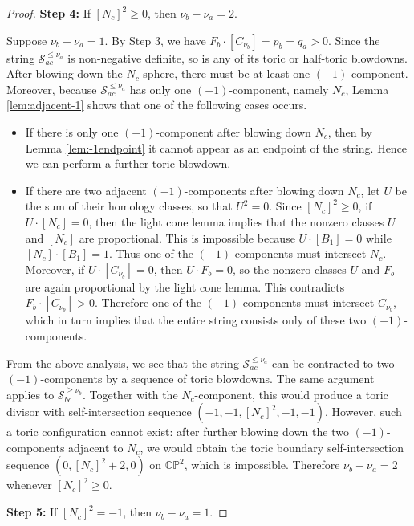 \documentclass[11pt]{article}
\theoremstyle{definition}
\theoremstyle{remark}
\newcommand{\CP}{\mathbb{CP}}
\newcommand{\st}{\mathcal{S}}
\begin{document}
\begin{proof}
\medskip
{\bf Step 4:} If $[N_c]^2\geq 0$, then $\nu_b-\nu_a=2$.

Suppose $\nu_b-\nu_a=1$. By Step 3, we have $F_b\cdot[C_{\nu_b}]=p_b=q_a>0$. Since the string $\st_{ac}^{\leq \nu_a}$ is non-negative definite, so is any of its toric or half-toric blowdowns. After blowing down the $N_c$-sphere, there must be at least one $(-1)$-component. Moreover, because $\st_{ac}^{\leq \nu_a}$ has only one $(-1)$-component, namely $N_c$, Lemma \ref{lem:adjacent-1} shows that one of the following cases occurs.
\begin{itemize}[nosep]
\item If there is only one $(-1)$-component after blowing down $N_c$, then by Lemma \ref{lem:-1endpoint} it cannot appear as an endpoint of the string. Hence we can perform a further toric blowdown.
\item If there are two adjacent $(-1)$-components after blowing down $N_c$, let $U$ be the sum of their homology classes, so that $U^2=0$. Since $[N_c]^2\geq 0$, if $U\cdot [N_c]=0$, then the light cone lemma implies that the nonzero classes $U$ and $[N_c]$ are proportional. This is impossible because $U\cdot [B_1]=0$ while $[N_c]\cdot [B_1]=1$. Thus one of the $(-1)$-components must intersect $N_c$. Moreover, if $U\cdot [C_{\nu_b}]=0$, then $U\cdot F_b=0$, so the nonzero classes $U$ and $F_b$ are again proportional by the light cone lemma. This contradicts $F_b\cdot [C_{\nu_b}]>0$. Therefore one of the $(-1)$-components must intersect $C_{\nu_b}$, which in turn implies that the entire string consists only of these two $(-1)$-components.
\end{itemize}

From the above analysis, we see that the string $\st_{ac}^{\leq \nu_a}$ can be contracted to two $(-1)$-components by a sequence of toric blowdowns. The same argument applies to $\st_{bc}^{\geq \nu_b}$. Together with the $N_c$-component, this would produce a toric divisor with self-intersection sequence $(-1,-1,[N_c]^2,-1,-1)$. However, such a toric configuration cannot exist: after further blowing down the two $(-1)$-components adjacent to $N_c$, we would obtain the toric boundary self-intersection sequence $(0,[N_c]^2+2,0)$ on $\CP^2$, which is impossible. Therefore $\nu_b-\nu_a=2$ whenever $[N_c]^2\geq 0$.

\medskip
{\bf Step 5:} If $[N_c]^2=-1$, then $\nu_b-\nu_a=1$.


\end{proof}
\end{document}
